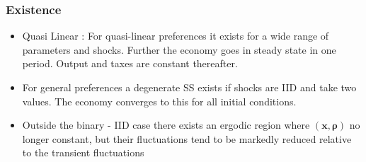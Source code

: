\documentclass{beamer}
\begin{document}
\begin{frame}
\frametitle{Existence}
\begin{itemize}
 \item Quasi Linear : For quasi-linear preferences it exists for a wide range of parameters and shocks. 
 Further the economy goes in steady state in one period. Output and taxes are constant thereafter.
 \item For general preferences a degenerate SS exists if shocks are IID and take two values. The economy converges to this for all initial conditions.
 \item Outside the binary - IID case there exists an ergodic region where $\left( \bm{x},\bm{\rho} \right) $ no longer constant, but their fluctuations tend to be markedly reduced relative to the transient fluctuations 
\end{itemize}
\end{frame}
\end{document}
